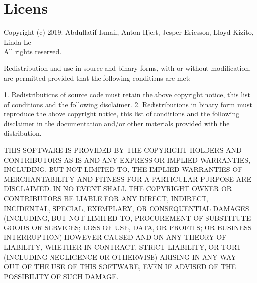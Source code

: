 \section{Licens}
\label{ref:licens}
Copyright (c) 2019: Abdullatif Ismail, Anton Hjert, Jesper Ericsson, Lloyd Kizito, Linda Le \\All rights reserved.

Redistribution and use in source and binary forms, with or without
modification, are permitted provided that the following conditions are met:

1. Redistributions of source code must retain the above copyright notice, this list of conditions and the following disclaimer.
2. Redistributions in binary form must reproduce the above copyright notice, this list of conditions and the following disclaimer in the documentation and/or other materials provided with the distribution.

THIS SOFTWARE IS PROVIDED BY THE COPYRIGHT HOLDERS AND CONTRIBUTORS AS IS AND ANY EXPRESS OR IMPLIED WARRANTIES, INCLUDING,
BUT NOT LIMITED TO, THE IMPLIED WARRANTIES OF MERCHANTABILITY AND FITNESS FOR A PARTICULAR PURPOSE ARE DISCLAIMED. IN NO EVENT
SHALL THE COPYRIGHT OWNER OR CONTRIBUTORS BE LIABLE FOR ANY DIRECT, INDIRECT, INCIDENTAL, SPECIAL, EXEMPLARY, OR CONSEQUENTIAL
DAMAGES (INCLUDING, BUT NOT LIMITED TO, PROCUREMENT OF SUBSTITUTE GOODS OR SERVICES; LOSS OF USE, DATA, OR PROFITS; OR BUSINESS
INTERRUPTION) HOWEVER CAUSED AND ON ANY THEORY OF LIABILITY, WHETHER IN CONTRACT, STRICT LIABILITY, OR TORT (INCLUDING
NEGLIGENCE OR OTHERWISE) ARISING IN ANY WAY OUT OF THE USE OF THIS SOFTWARE, EVEN IF ADVISED OF THE POSSIBILITY OF SUCH DAMAGE.
